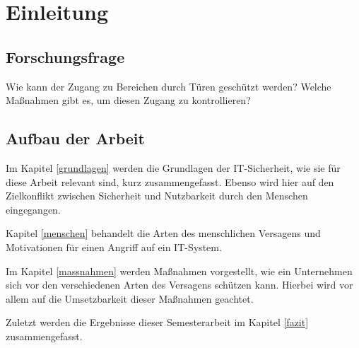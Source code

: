 \newpage
\section{Einleitung} \label{Einleitung}



\subsection{Forschungsfrage}
Wie kann der Zugang zu Bereichen durch Türen geschützt werden? Welche Maßnahmen
gibt es, um diesen Zugang zu kontrollieren?

\subsection{Aufbau der Arbeit}
Im Kapitel \ref{grundlagen} werden die Grundlagen der IT-Sicherheit, wie sie für diese
Arbeit relevant sind, kurz zusammengefasst. Ebenso wird hier auf den
Zielkonflikt zwischen Sicherheit und Nutzbarkeit durch den Menschen eingegangen.

Kapitel \ref{menschen} behandelt die Arten des menschlichen Versagens und Motivationen
für einen Angriff auf ein IT-System.

Im Kapitel \ref{massnahmen} werden Maßnahmen vorgestellt, wie ein Unternehmen sich vor den
verschiedenen Arten des Versagens schützen kann. Hierbei wird vor allem auf die
Umsetzbarkeit dieser Maßnahmen geachtet.

Zuletzt werden die Ergebnisse dieser Semesterarbeit im Kapitel \ref{fazit}
zusammengefasst.
